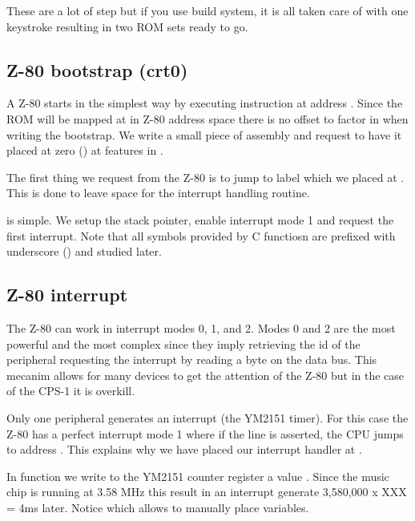 \begin{trivia}
These are a lot of step but if you use  build system, it is all taken care of with one keystroke resulting in two ROM sets ready to go.
\end{trivia}

\subsection{Z-80 bootstrap (crt0)}

A Z-80 starts in the simplest way by executing instruction at address . Since the ROM will be mapped at  in Z-80 address space there is no offset to factor in when writing the bootstrap. We write a small piece of assembly and request to have it placed at zero () at features in .
\pagebreak



The first thing we request from the Z-80 is to jump to label  which we placed at . This is done to leave space for the interrupt handling routine.

 is simple. We setup the stack pointer, enable interrupt mode 1 and request the first interrupt. Note that all symbols provided by C functiosn are prefixed with underscore (\icode{\_}) and studied later.

\subsection{Z-80 interrupt}
The Z-80 can work in interrupt modes 0, 1, and 2. Modes 0 and 2 are the most powerful and the most complex since they imply retrieving the id of the peripheral requesting the interrupt by reading a byte on the data bus. This mecanim allows for many devices to get the attention of the Z-80 but in the case of the CPS-1 it is overkill. 

Only one peripheral generates an interrupt (the YM2151 timer). For this case the Z-80 has a perfect interrupt mode 1 where if the  line is asserted, the CPU jumps to address . This explains why we have placed our interrupt handler at .




In function  we write to the YM2151 counter register a value . Since the music chip is running at 3.58 MHz this result in an interrupt generate 3,580,000 x XXX = 4ms later. Notice  which allows to manually place variables.

